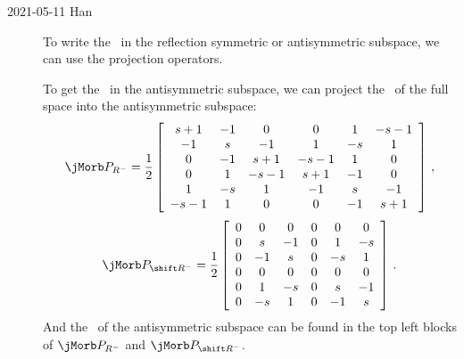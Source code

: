 \begin{description}


    \item[2021-05-11 Han]
To write the \jacobianOrb\ in the reflection symmetric or antisymmetric
subspace, we can use the projection operators.


To get the \jacobianOrb\ in the antisymmetric subspace,
we can project the \jacobianOrb\ of the full space into
the antisymmetric subspace:
\[
\jMorb P_{R^-} =
\frac{1}{2}
\left[
\begin{array}{cccccc}
 s+1 & -1 & 0 & 0 & 1 & -s-1 \\
 -1 & s & -1 & 1 & -s & 1 \\
 0 & -1 & s+1 & -s-1 & 1 & 0 \\
 0 & 1 & -s-1 & s+1 & -1 & 0 \\
 1 & -s & 1 & -1 & s & -1 \\
 -s-1 & 1 & 0 & 0 & -1 & s+1 \\
\end{array}
\right] \,,
\]
\[
\jMorb P_{\shift R^-} =
\frac{1}{2}
\left[
\begin{array}{cccccc}
 0 & 0 & 0 & 0 & 0 & 0 \\
 0 & s & -1 & 0 & 1 & -s \\
 0 & -1 & s & 0 & -s & 1 \\
 0 & 0 & 0 & 0 & 0 & 0 \\
 0 & 1 & -s & 0 & s & -1 \\
 0 & -s & 1 & 0 & -1 & s \\
\end{array}
\right] \,.
\]
And the \jacobianOrb\ of the antisymmetric subspace can
be found in the top left blocks of $\jMorb P_{R^-}$ and $\jMorb P_{\shift R^-}$.


\end{description}
